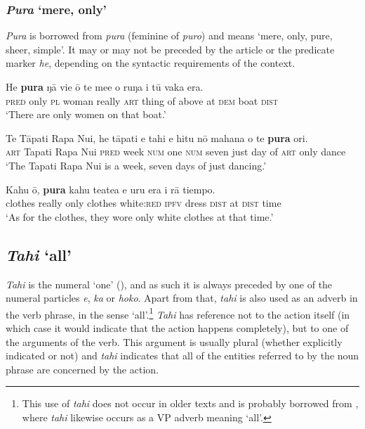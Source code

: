 \subsubsection{\textit{Pura} ‘mere, only’}\label{sec:4.4.8.3}
\textit{Pura} is borrowed from  \textit{pura} (feminine of \textit{puro}) and means ‘mere, only, pure, sheer, simple’. It may or may not be preceded by the article or the predicate marker \textit{he}, depending on the syntactic requirements of the context.

\ea\label{ex:4.114}
\gll He \textbf{pura} ŋā vi{\ꞌ}e {\ꞌ}ō te me{\ꞌ}e o ruŋa i tū vaka era. \\
\textsc{pred} only \textsc{pl} woman really \textsc{art} thing of above at \textsc{dem} boat \textsc{dist} \\

\glt 
‘There are only women on that boat.’ \textstyleExampleref{[R416.513]} 
\z

\ea\label{ex:4.115}
\gll Te Tāpati Rapa Nui, he tāpati e tahi e hitu nō mahana o te \textbf{pura} {\ꞌ}ori.\\
\textsc{art} Tapati Rapa Nui \textsc{pred} week \textsc{num} one \textsc{num} seven just day of \textsc{art} only dance\\

\glt 
‘The Tapati Rapa Nui is a week, seven days of just dancing.’ \textstyleExampleref{[R240.003]}  
\z

\ea\label{ex:4.116}
\gll Kahu {\ꞌ}ō, \textbf{pura} kahu teatea e uru era {\ꞌ}i rā tiempo. \\
clothes really only clothes white:\textsc{red} \textsc{ipfv} dress \textsc{dist} at \textsc{dist} time \\

\glt 
‘As for the clothes, they wore only white clothes at that time.’ \textstyleExampleref{[R416.1272]}
\z

\subsection{\textit{Tahi} ‘all’}\label{sec:4.4.9}
\textit{Tahi} is the numeral ‘one’ (), and as such it is always preceded by one of the numeral particles \textit{e}, \textit{ka} or \textit{hoko}. Apart from that, \textit{tahi} is also used as an adverb in the verb phrase, in the sense ‘all’.\footnote{\label{fn:189}This use of \textit{tahi} does not occur in older texts and is probably borrowed from , where \textit{tahi} likewise occurs as a VP adverb meaning ‘all’.} \textit{Tahi} has reference not to the action itself (in which case it would indicate that the action happens completely), but to one of the arguments of the verb. This argument is usually plural (whether explicitly indicated or not) and \textit{tahi} indicates that all of the entities referred to by the noun phrase are concerned by the action.

